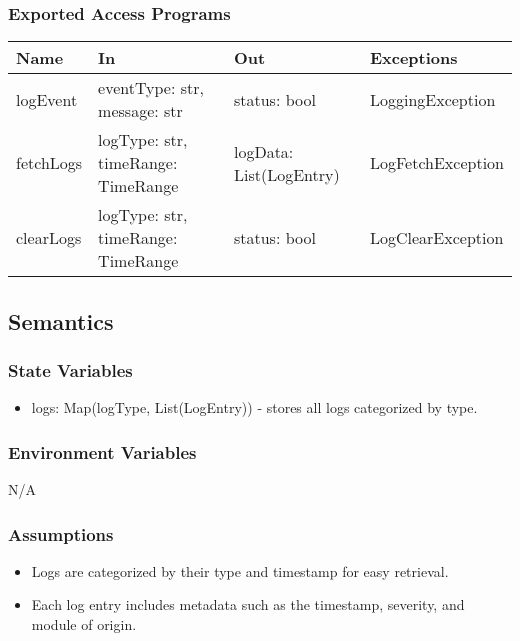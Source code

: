 \documentclass[12pt, titlepage]{article}
\begin{document}
\subsubsection{Exported Access Programs}

\begin{center}
\begin{tabular}{p{3cm} p{4cm} p{4cm} p{5cm}}
\hline
\textbf{Name} & \textbf{In} & \textbf{Out} & \textbf{Exceptions} \\
\hline
logEvent & \raggedright\arraybackslash eventType: str, message: str & \raggedright\arraybackslash status: bool & \raggedright\arraybackslash LoggingException \\
\hline
fetchLogs & \raggedright\arraybackslash logType: str, timeRange: TimeRange & \raggedright\arraybackslash logData: List(LogEntry) & \raggedright\arraybackslash LogFetchException \\
\hline
clearLogs & \raggedright\arraybackslash logType: str, timeRange: TimeRange & \raggedright\arraybackslash status: bool & \raggedright\arraybackslash LogClearException \\
\hline
\end{tabular}
\end{center}

\subsection{Semantics}

\subsubsection{State Variables}
\begin{itemize}
\item logs: Map(logType, List(LogEntry)) - stores all logs categorized by type.
\end{itemize}

\subsubsection{Environment Variables}
N/A

\subsubsection{Assumptions}
\begin{itemize}
\item Logs are categorized by their type and timestamp for easy retrieval.
\item Each log entry includes metadata such as the timestamp, severity, and module of origin.
\end{itemize}
\end{document}
